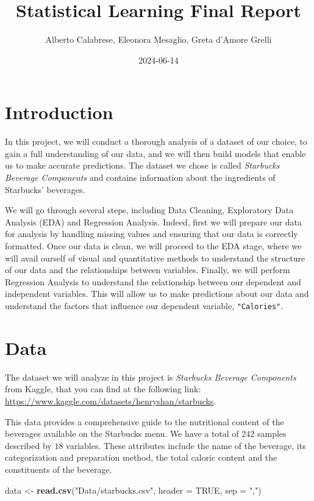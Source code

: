 \documentclass[
]{article}
\title{Statistical Learning Final Report}
\author{Alberto Calabrese, Eleonora Mesaglio, Greta d'Amore Grelli}
\date{2024-06-14}
\newenvironment{Shaded}{\begin{snugshade}}{\end{snugshade}}
\newcommand{\AttributeTok}[1]{\textcolor[rgb]{0.13,0.29,0.53}{#1}}
\newcommand{\ConstantTok}[1]{\textcolor[rgb]{0.56,0.35,0.01}{#1}}
\newcommand{\FunctionTok}[1]{\textcolor[rgb]{0.13,0.29,0.53}{\textbf{#1}}}
\newcommand{\NormalTok}[1]{#1}
\newcommand{\OtherTok}[1]{\textcolor[rgb]{0.56,0.35,0.01}{#1}}
\newcommand{\StringTok}[1]{\textcolor[rgb]{0.31,0.60,0.02}{#1}}
\begin{document}
\maketitle

{
\setcounter{tocdepth}{3}
\tableofcontents
}
\section{Introduction}\label{introduction}

In this project, we will conduct a thorough analysis of a dataset of our
choice, to gain a full understanding of our data, and we will then build
models that enable us to make accurate predictions. The dataset we chose
is called \emph{Starbucks Beverage Components} and contains information
about the ingredients of Starbucks' beverages.

We will go through several steps, including Data Cleaning, Exploratory
Data Analysis (EDA) and Regression Analysis. Indeed, first we will
prepare our data for analysis by handling missing values and ensuring
that our data is correctly formatted. Once our data is clean, we will
proceed to the EDA stage, where we will avail ourself of visual and
quantitative methods to understand the structure of our data and the
relationships between variables. Finally, we will perform Regression
Analysis to understand the relationship between our dependent and
independent variables. This will allow us to make predictions about our
data and understand the factors that influence our dependent variable,
\texttt{"Calories"}.

\section{Data}\label{data}

The dataset we will analyze in this project is \emph{Starbucks Beverage
Components} from Kaggle, that you can find at the following link:
\url{https://www.kaggle.com/datasets/henryshan/starbucks}.

This data provides a comprehensive guide to the nutritional content of
the beverages available on the Starbucks menu. We have a total of
\(242\) samples described by \(18\) variables. These attributes include
the name of the beverage, its categorization and preparation method, the
total caloric content and the constituents of the beverage.

\begin{Shaded}
\begin{Highlighting}[]
\NormalTok{data }\OtherTok{\textless{}{-}} \FunctionTok{read.csv}\NormalTok{(}\StringTok{"Data/starbucks.csv"}\NormalTok{, }\AttributeTok{header =} \ConstantTok{TRUE}\NormalTok{, }\AttributeTok{sep =} \StringTok{","}\NormalTok{)}
\end{Highlighting}
\end{Shaded}
\end{document}
